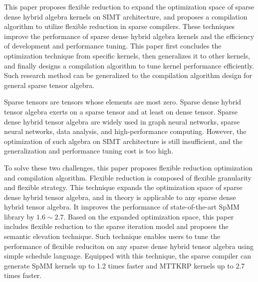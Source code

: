 \begin{abstract*}
  This paper proposes flexible reduction to expand the optimization space of sparse dense hybrid algebra kernels on SIMT architecture,
   and proposes a compilation algorithm to utilize flexible reduction in sparse compilers. These techniques improve the performance of 
   sparse dense hybrid algebra kernels and the efficiency of development and performance tuning. This paper first concludes the optimization technique from specific kernels, then generalizes it to other kernels, and finally designs 
   a compilation algorithm to tune kernel performance efficiently. Such research method can be generalized to the compilation algorithm design for general sparse tensor algebra.

  Sparse tensors are tensors whose elements are most zero. Sparse dense hybrid tensor algebra exerts on a sparse tensor and at least on dense tensor. 
  Sparse dense hybrid tensor algebra are widely used in graph neural networks, sparse neural networks, data analysis, and high-performance computing. 
  However, the optimization of such algebra on SIMT architecture is still insufficient, and the generalization and performance tuning cost is too high.

  To solve these two challenges, this paper proposes flexible reduction optimization and compilation algorithm. Flexible reduction is composed of flexible granularity and flexible strategy. 
  This technique expands the optimization space of sparse dense hybrid tensor algebra, and in theory is applicable to any sparse dense hybrid tensor algebra. It improves the performance
  of state-of-the-art SpMM library by $1.6 \sim 2.7$. Based on the expanded optimization space, this paper includes flexible reduction to the sparse iteration model and proposes the semantic elevation technique.
  Such technique enables users to tune the performance of flexible reduciton on any sparse dense hybrid tensor algebra using simple schedule language. Equipped with this technique, the sparse compiler can generate SpMM kernels up to 1.2 times faster and MTTKRP kernels up to 2.7 times faster.
\end{abstract*}
